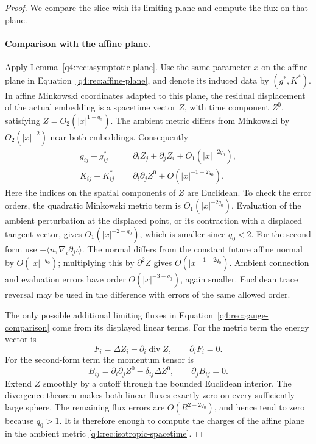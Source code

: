 \begin{proof}
We compare the slice with its limiting plane and compute the flux on that plane.

\paragraph{Comparison with the affine plane.}
Apply Lemma~\ref{q4:rec:asymptotic-plane}.  Use the same parameter $x$ on the
affine plane in Equation~\eqref{q4:rec:affine-plane}, and denote its induced data
by $(g^*,K^*)$.  In affine Minkowski coordinates adapted to this plane, the
residual displacement of the actual embedding is a spacetime vector $Z$,
with time component $Z^0$, satisfying $Z=O_2(|x|^{1-q_0})$.  The ambient
metric differs from Minkowski by $O_2(|x|^{-2})$ near both embeddings.
Consequently
\begin{equation}
 \begin{split}
 g_{ij}-g^*_{ij}
   &=\partial_iZ_j+\partial_jZ_i+O_1(|x|^{-2q_0}),\\
 K_{ij}-K^*_{ij}
   &=\partial_i\partial_jZ^0+O(|x|^{-1-2q_0}).
 \end{split}
 \label{q4:rec:gauge-comparison}
\end{equation}
Here the indices on the spatial components of $Z$ are Euclidean.
To check the error orders, the quadratic Minkowski metric term is
$O_1(|x|^{-2q_0})$.  Evaluation of the ambient perturbation at the displaced
point, or its contraction with a displaced tangent vector, gives
$O_1(|x|^{-2-q_0})$, which is smaller since $q_0<2$.  For the second form use
$-\langle n,\nabla_i\partial_j\iota\rangle$.  The normal differs from the
constant future affine normal by $O(|x|^{-q_0})$; multiplying this by
$\partial^2Z$ gives $O(|x|^{-1-2q_0})$.  Ambient connection and evaluation
errors have order $O(|x|^{-3-q_0})$, again smaller.  Euclidean trace reversal
may be used in the difference with errors of the same allowed order.

The only possible additional limiting fluxes in
Equation~\eqref{q4:rec:gauge-comparison} come from its displayed linear terms.
For the metric term the energy vector is
\[
 F_i=\Delta Z_i-\partial_i\operatorname{div}Z,
 \qquad \partial_iF_i=0.
\]
For the second-form term the momentum tensor is
\[
 B_{ij}=\partial_i\partial_jZ^0-\delta_{ij}\Delta Z^0,
 \qquad \partial_jB_{ij}=0.
\]
Extend $Z$ smoothly by a cutoff through the bounded Euclidean interior.
The divergence theorem makes both linear fluxes exactly zero on every
sufficiently large sphere.  The remaining flux errors are
$O(R^{2-2q_0})$, and hence tend to zero because $q_0>1$.  It is therefore
enough to compute the charges of the affine plane in the ambient metric
\eqref{q4:rec:isotropic-spacetime}.


\end{proof}
